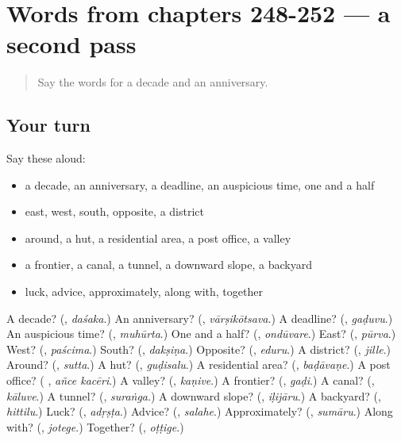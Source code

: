 \section[(dialogue)]{Words from chapters 248-252 — a second pass}

\label{lesson:KA-R252-second-pass-words-from-chapters-248-252}



\begin{quote}
Say the words for a decade and an anniversary.
\end{quote}

\subsection*{Your turn}
Say these aloud:

\begin{itemize}
\raggedright
  \item a decade, an anniversary, a deadline, an auspicious time, one and a half
  \item east, west, south, opposite, a district
  \item around, a hut, a residential area, a post office, a valley
  \item a frontier, a canal, a tunnel, a downward slope, a backyard
  \item luck, advice, approximately, along with, together
\end{itemize}

\begin{tcolorbox}[breakable,colback=teal!4,colframe=teal!35!black,title={Before you move on}]
A decade? (\textbf{}, \emph{daśaka}.) An anniversary? (\textbf{}, \emph{vārṣikōtsava}.) A deadline? (\textbf{}, \emph{gaḍuvu}.) An auspicious time? (\textbf{}, \emph{muhūrta}.) One and a half? (\textbf{}, \emph{ondūvare}.) East? (\textbf{}, \emph{pūrva}.) West? (\textbf{}, \emph{paścima}.) South? (\textbf{}, \emph{dakṣiṇa}.) Opposite? (\textbf{}, \emph{eduru}.) A district? (\textbf{}, \emph{jille}.) Around? (\textbf{}, \emph{sutta}.) A hut? (\textbf{}, \emph{guḍisalu}.) A residential area? (\textbf{}, \emph{baḍāvaṇe}.) A post office? (\textbf{ }, \emph{añce kacēri}.) A valley? (\textbf{}, \emph{kaṇive}.) A frontier? (\textbf{}, \emph{gaḍi}.) A canal? (\textbf{}, \emph{kāluve}.) A tunnel? (\textbf{}, \emph{suraṅga}.) A downward slope? (\textbf{}, \emph{iḷijāru}.) A backyard? (\textbf{}, \emph{hittilu}.) Luck? (\textbf{}, \emph{adṛṣṭa}.) Advice? (\textbf{}, \emph{salahe}.) Approximately? (\textbf{}, \emph{sumāru}.) Along with? (\textbf{}, \emph{jotege}.) Together? (\textbf{}, \emph{oṭṭige}.)
\end{tcolorbox}
